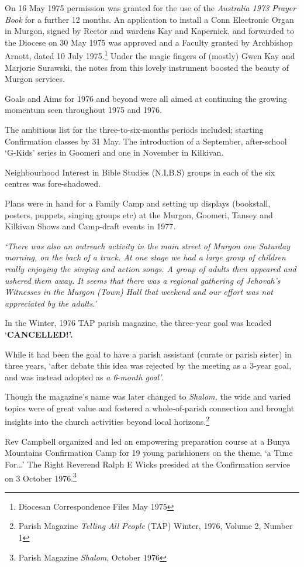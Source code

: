 On 16 May 1975 permission was granted for the use of the \emph{Australia 1973 Prayer Book} for a further 12 months. An application to install a Conn Electronic Organ in Murgon, signed by Rector and wardens Kay and Kapernick, and forwarded to the Diocese on 30 May 1975 was approved and a Faculty granted by Archbishop Arnott, dated 10 July 1975.\footnote{Diocesan Correspondence Files May 1975} Under the magic fingers of (mostly) Gwen Kay and Marjorie Surawski, the notes from this lovely instrument boosted the beauty of Murgon services.

Goals and Aims for 1976 and beyond were all aimed at continuing the growing momentum seen throughout 1975 and 1976.

The ambitious list for the three-to-six-months periods included; starting Confirmation classes by 31 May. The introduction of a September, after-school `G-Kids' series in Goomeri and one in November in Kilkivan.

Neighbourhood Interest in Bible Studies (N.I.B.S) groups in each of the six centres was fore-shadowed.

Plans were in hand for a Family Camp and setting up displays (bookstall, posters, puppets, singing groups etc) at the Murgon, Goomeri, Tansey and Kilkivan Shows and Camp-draft events in 1977\emph{.}

\emph{`There was also an outreach activity in the main street of Murgon one Saturday morning, on the back of a truck. At one stage we had a large group of children really enjoying the singing and action songs. A group of adults then appeared and ushered them away. It seems that there was a regional gathering of Jehovah's Witnesses in the Murgon (Town) Hall that weekend and our effort was not appreciated by the adults.'}

In the Winter, 1976 TAP parish magazine, the three-year goal was headed `\textbf{CANCELLED!'.}

While it had been the goal to have a parish assistant (curate or parish sister) in three years, `after debate this idea was rejected by the meeting as a 3-year goal, and was instead adopted as \emph{a 6}-\emph{month goal'}.

Though the magazine's name was later changed to \emph{Shalom,} the wide and varied topics were of great value and fostered a whole-of-parish connection and brought insights into the church activities beyond local horizons.\footnote{Parish Magazine \emph{Telling All People} (TAP) Winter, 1976, Volume 2, Number 1}

Rev Campbell organized and led an empowering preparation course at a Bunya Mountains Confirmation Camp for 19 young parishioners on the theme, `a Time For\ldots' The Right Reverend Ralph E Wicks presided at the Confirmation service on 3 October 1976.\footnote{Parish Magazine \emph{Shalom}, October 1976}

